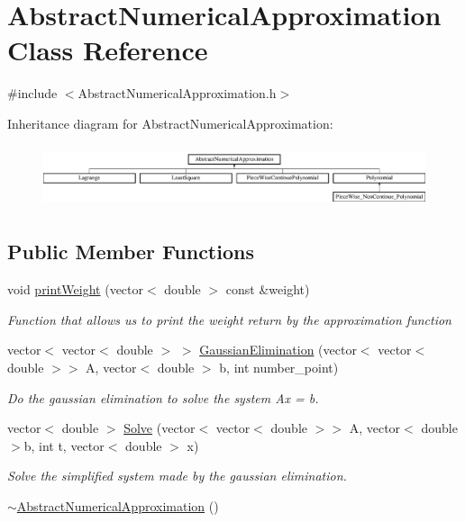 \hypertarget{class_abstract_numerical_approximation}{}\section{Abstract\+Numerical\+Approximation Class Reference}
\label{class_abstract_numerical_approximation}


{\ttfamily \#include $<$Abstract\+Numerical\+Approximation.\+h$>$}

Inheritance diagram for Abstract\+Numerical\+Approximation\+:\begin{figure}[H]
\begin{center}
\leavevmode
\includegraphics[height=1.850220cm]{class_abstract_numerical_approximation}
\end{center}
\end{figure}
\subsection*{Public Member Functions}
\begin{DoxyCompactItemize}
\item 
void \mbox{\hyperlink{class_abstract_numerical_approximation_a841c83a7ae9f2146001581f3a7f8444a}{print\+Weight}} (vector$<$ double $>$ const \&weight)
\begin{DoxyCompactList}\small\item\em Function that allows us to print the weight return by the approximation function \end{DoxyCompactList}\item 
vector$<$ vector$<$ double $>$ $>$ \mbox{\hyperlink{class_abstract_numerical_approximation_aed569247300dcb9eb54c6117903d2583}{Gaussian\+Elimination}} (vector$<$ vector$<$ double $>$$>$ A, vector$<$ double $>$ b, int number\+\_\+point)
\begin{DoxyCompactList}\small\item\em Do the gaussian elimination to solve the system Ax = b. \end{DoxyCompactList}\item 
vector$<$ double $>$ \mbox{\hyperlink{class_abstract_numerical_approximation_abccba1cb27301df86f2adbfa5e6525a5}{Solve}} (vector$<$ vector$<$ double $>$$>$ A, vector$<$ double $>$b, int t, vector$<$ double $>$ x)
\begin{DoxyCompactList}\small\item\em Solve the simplified system made by the gaussian elimination. \end{DoxyCompactList}\item 
\mbox{\hyperlink{class_abstract_numerical_approximation_a358054cadc54f5d0c7891505da040783}{$\sim$\+Abstract\+Numerical\+Approximation}} ()
\end{DoxyCompactItemize}


